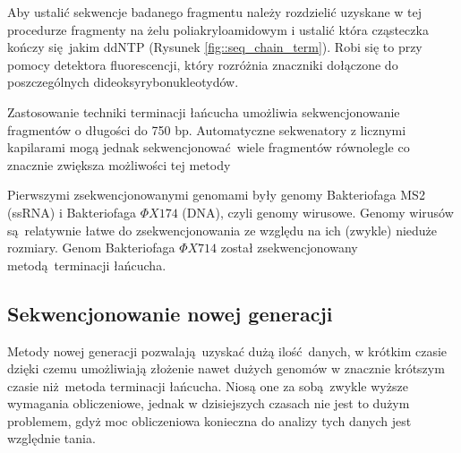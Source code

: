 \documentclass[two column, twoside, a4paper]{article}
\begin{document}
Aby ustalić sekwencje badanego fragmentu należy rozdzielić uzyskane w tej procedurze fragmenty na żelu poliakryloamidowym i ustalić która cząsteczka kończy się jakim ddNTP (Rysunek \ref{fig::seq_chain_term}). Robi się to przy pomocy detektora fluorescencji, który rozróżnia znaczniki dołączone do poszczególnych dideoksyrybonukleotydów.

Zastosowanie techniki terminacji łańcucha umożliwia sekwencjonowanie fragmentów o długości do 750 bp. Automatyczne sekwenatory z licznymi kapilarami mogą jednak sekwencjonować wiele fragmentów równolegle co znacznie zwiększa możliwości tej metody \autocite{Brown2019}

Pierwszymi zsekwencjonowanymi genomami były genomy Bakteriofaga MS2 (ssRNA) i Bakteriofaga $\Phi X174$ \autocite{Sanger1978} (DNA), czyli genomy wirusowe. Genomy wirusów są relatywnie łatwe do zsekwencjonowania ze względu na ich (zwykle) nieduże rozmiary. Genom Bakteriofaga $\Phi X714$ został zsekwencjonowany metodą terminacji łańcucha.

\subsection{Sekwencjonowanie nowej generacji}

Metody nowej generacji pozwalają uzyskać dużą ilość danych, w krótkim czasie dzięki czemu umożliwiają złożenie nawet dużych genomów w znacznie krótszym czasie niż metoda terminacji łańcucha. Niosą one za sobą zwykle wyższe wymagania obliczeniowe, jednak w dzisiejszych czasach nie jest to dużym problemem, gdyż moc obliczeniowa konieczna do analizy tych danych jest względnie tania.
\end{document}
